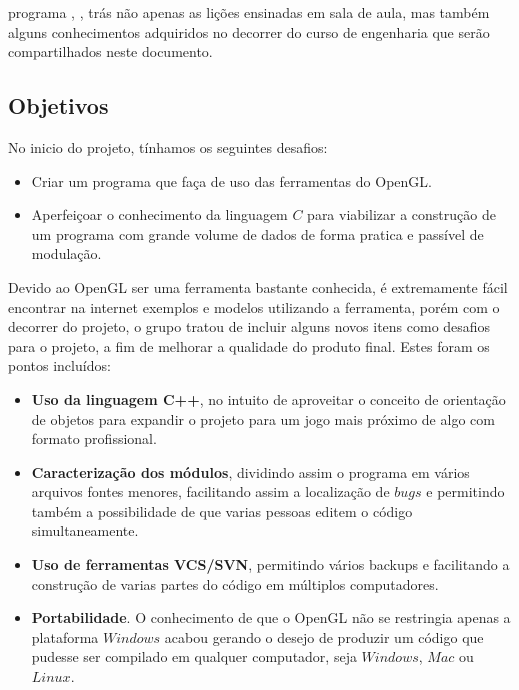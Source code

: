﻿%



%
%

 programa , \assunto, trás não apenas as lições ensinadas em sala de aula, mas também alguns conhecimentos adquiridos no decorrer do curso de engenharia que serão compartilhados neste documento.

\subsection{Objetivos}\label{obj}


No inicio do projeto, tínhamos os seguintes desafios:

\begin{itemize}
	\item Criar um programa que faça de uso das ferramentas do OpenGL.
	\item Aperfeiçoar o conhecimento da linguagem $C$ para viabilizar a construção de um programa com grande volume de dados de forma pratica e passível de modulação.
\end{itemize}

Devido ao OpenGL ser uma ferramenta bastante conhecida, é extremamente fácil encontrar na internet exemplos e modelos utilizando a ferramenta, porém com o decorrer do projeto, o grupo tratou de incluir alguns novos itens como desafios para o projeto, a fim de melhorar a qualidade do produto final. Estes foram os pontos incluídos:

\begin{itemize}
	\item \textbf{Uso da linguagem C++}, no intuito de aproveitar o conceito de orientação de objetos para expandir o projeto para um jogo mais próximo de algo com formato profissional.
	\item \textbf{Caracterização dos módulos}, dividindo assim o programa em vários arquivos fontes menores, facilitando assim a localização de $bugs$ e permitindo também a possibilidade de que varias pessoas editem o código simultaneamente.
	\item \textbf{Uso de ferramentas VCS/SVN}, permitindo vários backups e facilitando a construção de varias partes do código em múltiplos computadores.
	\item \textbf{Portabilidade}. O conhecimento de que o OpenGL não se restringia apenas a plataforma $Windows$ acabou gerando o desejo de produzir um código que pudesse ser compilado em qualquer computador, seja $Windows$, $Mac$ ou $Linux$.
\end{itemize}

